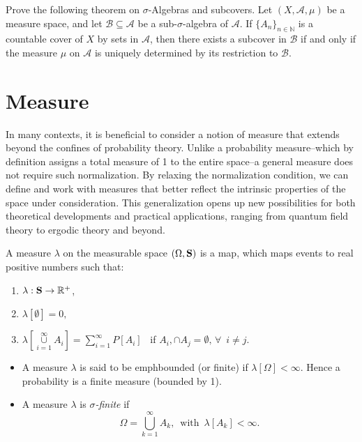 \begin{ex}\label{Ex:BorelThm} Prove the following theorem on $\sigma$-Algebras and subcovers.
Let $(X, \mathcal{A}, \mu)$ be a measure space, and let $\mathcal{B} \subseteq \mathcal{A}$ be a sub-$\sigma$-algebra of $\mathcal{A}$. If $\{ A_n \}_{n \in \mathbb{N}}$ is a countable cover of $X$ by sets in $\mathcal{A}$, then there exists a subcover in $\mathcal{B}$ if and only if the measure $\mu$ on $\mathcal{A}$ is uniquely determined by its restriction to $\mathcal{B}$.
\end{ex}

\section{Measure}\label{sec:meas}
In many contexts, it is beneficial to consider a notion of measure that extends beyond the confines of probability theory. Unlike a probability measure--which by definition assigns a total measure of 1 to the entire space--a general measure does not require such normalization. By relaxing the normalization condition, we can define and work with measures that better reflect the intrinsic properties of the space under consideration. This generalization opens up new possibilities for both theoretical developments and practical applications, ranging from quantum field theory to ergodic theory and beyond.

\begin{definition}
 A measure $\lambda$ on the measurable space $(\Omega,{\mathbf{S}})$ is a map, which maps events to real positive numbers such that:
\begin{enumerate}
\item $\lambda: {\mathbf{S}}\to \mathbb{R}^+$,
 \item $\lambda[\emptyset] = 0,$
\item $\lambda[\mathop{\cup}\limits_{i=1}^\infty A_i] =
\sum\limits_{i=1}^\infty P[A_i]\enspace$ if $ A_i,\cap A_j = \emptyset, \,
 \forall\enspace i \not= j.$
\end{enumerate}
\end{definition}

\vspace{5pt}
\begin{itemize}
\item A measure $\lambda$ is said to be emph{bounded (or finite)} if  $\lambda[\Omega]<\infty $.
Hence a probability is a finite measure (bounded by 1).\\

\item A measure $\lambda$ is \emph{$\sigma$-finite} if 
\[\Omega =
\bigcup\limits_{k=1}^\infty
A_k, \, \text{ with  }\,  \lambda[A_k]< \infty.\] 
\end{itemize}


